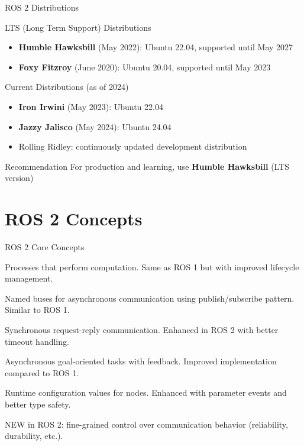 \begin{frame}[allowframebreaks]{ROS 2 Distributions}
    \begin{block}{LTS (Long Term Support) Distributions}
        \begin{itemize}
            \item \textbf{Humble Hawksbill} (May 2022): Ubuntu 22.04, supported until May 2027
            \item \textbf{Foxy Fitzroy} (June 2020): Ubuntu 20.04, supported until May 2023
        \end{itemize}
    \end{block}

    \begin{block}{Current Distributions (as of 2024)}
        \begin{itemize}
            \item \textbf{Iron Irwini} (May 2023): Ubuntu 22.04
            \item \textbf{Jazzy Jalisco} (May 2024): Ubuntu 24.04
            \item Rolling Ridley: continuously updated development distribution
        \end{itemize}
    \end{block}

    \begin{alertblock}{Recommendation}
        For production and learning, use \textbf{Humble Hawksbill} (LTS version)
    \end{alertblock}
\end{frame}

\section{ROS 2 Concepts}

\begin{frame}[allowframebreaks]{ROS 2 Core Concepts}
    \begin{description}[leftmargin=3cm]
        \item[Nodes] Processes that perform computation. Same as ROS 1 but with improved lifecycle management.

        \item[Topics] Named buses for asynchronous communication using publish/subscribe pattern. Similar to ROS 1.

        \item[Services] Synchronous request-reply communication. Enhanced in ROS 2 with better timeout handling.

        \item[Actions] Asynchronous goal-oriented tasks with feedback. Improved implementation compared to ROS 1.

        \item[Parameters] Runtime configuration values for nodes. Enhanced with parameter events and better type safety.

        \item[Quality of Service (QoS)] NEW in ROS 2: fine-grained control over communication behavior (reliability, durability, etc.).
    \end{description}
\end{frame}

